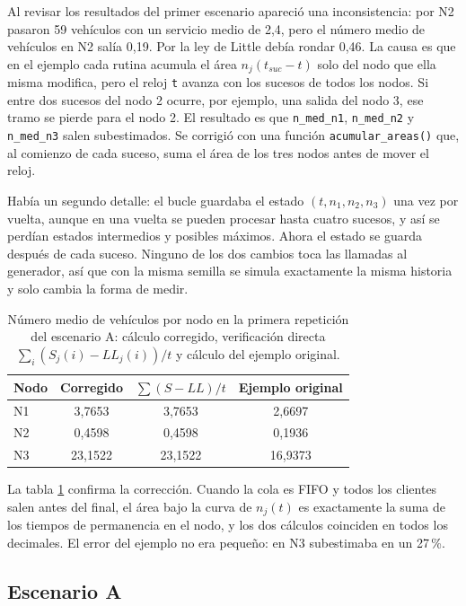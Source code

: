\documentclass[11pt,letterpaper]{article}
\begin{document}
Al revisar los resultados del primer escenario apareció una inconsistencia: por N2 pasaron 59 vehículos con un
servicio medio de 2,4, pero el número medio de vehículos en N2 salía 0,19. Por la ley de Little debía rondar
0,46. La causa es que en el ejemplo cada rutina acumula el área $n_j(t_{suc} - t)$ solo del nodo que
ella misma modifica, pero el reloj \texttt{t} avanza con los sucesos de todos los nodos. Si entre dos sucesos
del nodo 2 ocurre, por ejemplo, una salida del nodo 3, ese tramo se pierde para el nodo 2. El resultado es que
\texttt{n\_med\_n1}, \texttt{n\_med\_n2} y \texttt{n\_med\_n3} salen subestimados. Se corrigió con una función
\texttt{acumular\_areas()} que, al comienzo de cada suceso, suma el área de los tres nodos antes de mover el
reloj.

Había un segundo detalle: el bucle guardaba el estado $(t, n_1, n_2, n_3)$ una vez por vuelta, aunque en una
vuelta se pueden procesar hasta cuatro sucesos, y así se perdían estados intermedios y posibles máximos. Ahora el
estado se guarda después de cada suceso. Ninguno de los dos cambios toca las llamadas al generador, así que con
la misma semilla se simula exactamente la misma historia y solo cambia la forma de medir.

\begin{table}[H]
\centering
\caption{Número medio de vehículos por nodo en la primera repetición del escenario A: cálculo corregido,
verificación directa $\sum_i (S_j(i) - LL_j(i))/t$ y cálculo del ejemplo original.}
\label{tab:52verif}
\small
\begin{tabular}{@{}lccc@{}}
\toprule
Nodo & Corregido & $\sum (S - LL)/t$ & Ejemplo original \\
\midrule
N1 & 3,7653 & 3,7653 & 2,6697 \\
N2 & 0,4598 & 0,4598 & 0,1936 \\
N3 & 23,1522 & 23,1522 & 16,9373 \\
\bottomrule
\end{tabular}
\end{table}

La tabla \ref{tab:52verif} confirma la corrección. Cuando la cola es FIFO y todos los clientes salen antes del
final, el área bajo la curva de $n_j(t)$ es exactamente la suma de los tiempos de permanencia en el nodo, y los
dos cálculos coinciden en todos los decimales. El error del ejemplo no era pequeño: en N3 subestimaba en un
27\,\%.

\subsection{Escenario A}
\end{document}
